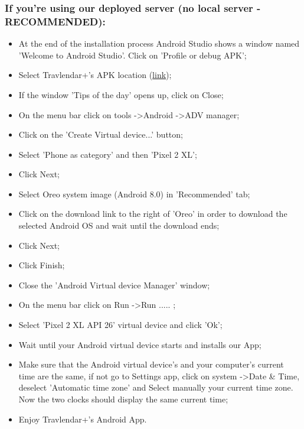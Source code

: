 \subsubsection{If you're using our deployed server (no local server - RECOMMENDED):}
\begin{itemize}
	\item At the end of the installation process Android Studio shows a window named 'Welcome to Android Studio'. Click on 'Profile or debug APK';
	\item Select Travlendar+'s APK location (\href{https://github.com/JustSalva/MelziPinaSalvadore/tree/master/DeliveryFolder/InstallationFolder}{\color{blue}link});
	\item If the window 'Tips of the day' opens up, click on Close;
	\item On the menu bar click on tools -\textgreater Android -\textgreater ADV manager;
	\item Click on the 'Create Virtual device...' button;
	\item Select 'Phone as category' and then 'Pixel 2 XL';
	\item Click Next;
	\item Select Oreo system image (Android 8.0) in 'Recommended' tab;
	\item Click on the download link to the right of 'Oreo' in order to download the selected Android OS and wait until the download ends; 
	\item Click Next;
	\item Click Finish;
	\item Close the 'Android Virtual device Manager' window;
	\item On the menu bar click on Run -\textgreater Run ..... ;
	\item Select 'Pixel 2 XL API 26' virtual device and click 'Ok';
	\item Wait until your Android virtual device starts and installs our App;
	\item Make sure that the Android virtual device's and your computer's current time are the same, if not go to Settings app, click on system -\textgreater Date \& Time, deselect 'Automatic time zone' and Select manually your current time zone. Now the two clocks should display the same current time;
	\item Enjoy Travlendar+'s Android App.	
\end{itemize}

